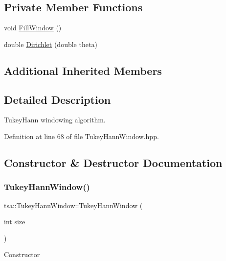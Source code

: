 \subsection*{Private Member Functions}
\begin{DoxyCompactItemize}
\item 
void \hyperlink{classtsa_1_1_tukey_hann_window_a041a98810aa841fd88d19139bf0e977f}{Fill\+Window} ()
\item 
double \hyperlink{classtsa_1_1_tukey_hann_window_a6d97dd74ecf13fce86fc5a9349cbd598}{Dirichlet} (double theta)
\end{DoxyCompactItemize}
\subsection*{Additional Inherited Members}


\subsection{Detailed Description}
Tukey\+Hann windowing algorithm. 

Definition at line 68 of file Tukey\+Hann\+Window.\+hpp.



\subsection{Constructor \& Destructor Documentation}
\mbox{\label{classtsa_1_1_tukey_hann_window_abdd4209c65b5774c0279a7ea2ce2fa7b}} 
\subsubsection{\texorpdfstring{Tukey\+Hann\+Window()}{TukeyHannWindow()}\hspace{0.1cm}{\footnotesize\ttfamily [1/2]}}
{\footnotesize\ttfamily tsa\+::\+Tukey\+Hann\+Window\+::\+Tukey\+Hann\+Window (\begin{DoxyParamCaption}\item[{int}]{size }\end{DoxyParamCaption})\hspace{0.3cm}{\ttfamily [inline]}}

Constructor


